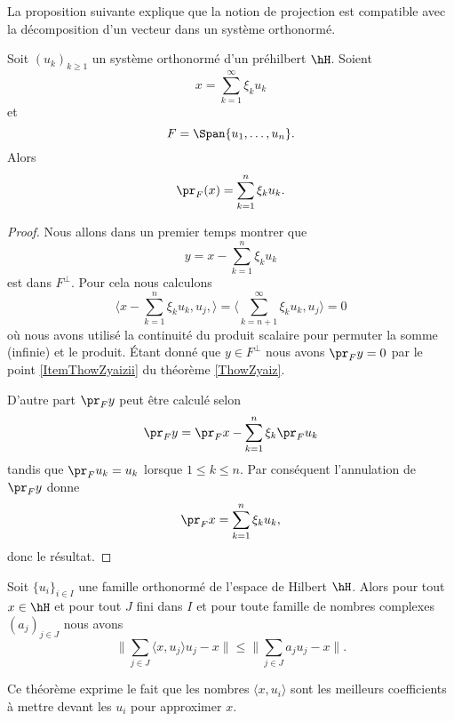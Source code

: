 La proposition suivante explique que la notion de projection est compatible avec la décomposition d'un vecteur dans un système orthonormé.
\begin{proposition}
    Soit \( (u_k)_{k\geq 1}\) un système orthonormé d'un préhilbert \( \hH\). Soient 
    \begin{equation}
        x=\sum_{k=1}^{\infty}\xi_ku_k
    \end{equation}
    et
    \begin{equation}
        F=\Span\{ u_1,\ldots, u_n \}.
    \end{equation}
    Alors 
    \begin{equation}
        \pr_F(x)=\sum_{k=1}^n\xi_ku_k.
    \end{equation}
\end{proposition}

\begin{proof}
    Nous allons dans un premier temps montrer que 
    \begin{equation}
        y=x-\sum_{k=1}^n\xi_ku_k
    \end{equation}
    est dans \( F^{\perp}\). Pour cela nous calculons
    \begin{equation}
        \langle x-\sum_{k=1}^n\xi_ku_k,u_j, \rangle =\langle \sum_{k=n+1}^{\infty}\xi_ku_k, u_j\rangle =0
    \end{equation}
    où nous avons utilisé la continuité du produit scalaire pour permuter la somme (infinie) et le produit. Étant donné que \( y\in F^{\perp}\) nous avons \( \pr_Fy=0\) par le point \ref{ItemThowZyaizii} du théorème \ref{ThowZyaiz}.

    D'autre part \( \pr_Fy\) peut être calculé selon
    \begin{equation}
        \pr_Fy=\pr_Fx-\sum_{k=1}^n\xi_k\pr_Fu_k
    \end{equation}
    tandis que \( \pr_Fu_k=u_k\) lorsque \( 1\leq k\leq n\). Par conséquent l'annulation de \( \pr_Fy\) donne
    \begin{equation}
        \pr_Fx=\sum_{k=1}^n\xi_ku_k,
    \end{equation}
    donc le résultat.
\end{proof}

\begin{theorem} \label{ThooRArDp}
    Soit \( \{ u_i \}_{i\in I}\) une famille orthonormé de l'espace de Hilbert \( \hH\). Alors pour tout \( x\in \hH\) et pour tout \( J\) fini dans \( I\) et pour toute famille de nombres complexes  \( (a_j)_{j\in J}\) nous avons
    \begin{equation}
        \| \sum_{j\in J}\langle x, u_j\rangle u_j-x \|\leq \| \sum_{j\in J}a_ju_j-x \|.
    \end{equation}
\end{theorem}
Ce théorème exprime le fait que les nombres \( \langle x, u_i\rangle \) sont les meilleurs coefficients à mettre devant les \( u_i\) pour approximer \( x\).

